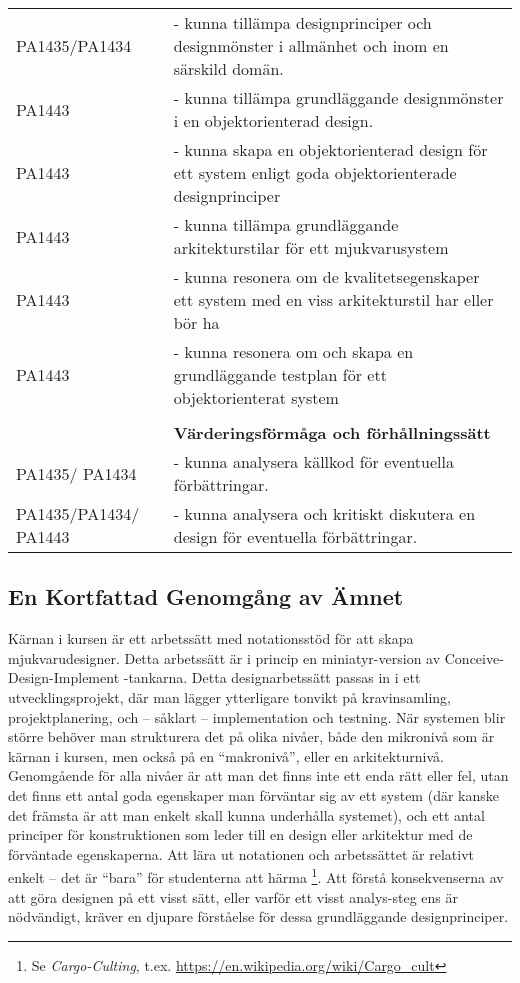 \documentclass[10pt,t,a4paper]{article}
\begin{document}
\begin{table}[!t]
\begin{tabular}{p{3cm}p{12cm}}
PA1435/PA1434 & - kunna tillämpa designprinciper och designmönster i allmänhet och inom en särskild domän.\\
PA1443 & - kunna tillämpa grundläggande designmönster i en objektorienterad design.\\
PA1443 & - kunna skapa en objektorienterad design för ett system enligt goda objektorienterade designprinciper\\
PA1443 & - kunna tillämpa grundläggande arkitekturstilar för ett mjukvarusystem\\
PA1443 & - kunna resonera om de kvalitetsegenskaper ett system med en viss arkitekturstil har eller bör ha\\
PA1443 & - kunna resonera om och skapa en grundläggande testplan för ett objektorienterat system\\
 & \\
 & \textbf{Värderingsförmåga och förhållningssätt}\\
PA1435/ PA1434 & - kunna analysera källkod för eventuella förbättringar.\\
PA1435/PA1434/ PA1443 & - kunna analysera och kritiskt diskutera en design för eventuella förbättringar.\\
\hline
\end{tabular}
\end{table}

\subsection{En Kortfattad Genomgång av Ämnet}
\label{sec:orgheadline1}
Kärnan i kursen är ett arbetssätt med notationsstöd för att skapa mjukvarudesigner. Detta arbetssätt är i princip en miniatyr-version av Conceive-Design-Implement -tankarna. Detta designarbetssätt passas in i ett utvecklingsprojekt, där man lägger ytterligare tonvikt på kravinsamling, projektplanering, och -- såklart -- implementation och testning. När systemen blir större behöver man strukturera det på olika nivåer, både den mikronivå som är kärnan i kursen, men också på en ``makronivå'', eller en arkitekturnivå. Genomgående för alla nivåer är att man det finns inte ett enda rätt eller fel, utan det finns ett antal goda egenskaper man förväntar sig av ett system (där kanske det främsta är att man enkelt skall kunna underhålla systemet), och ett antal principer för konstruktionen som leder till en design eller arkitektur med de förväntade egenskaperna. Att lära ut notationen och arbetssättet är relativt enkelt -- det är ``bara'' för studenterna att härma \footnote{Se \emph{Cargo-Culting}, t.ex. \url{https://en.wikipedia.org/wiki/Cargo_cult}}. Att förstå konsekvenserna av att göra designen på ett visst sätt, eller varför ett visst analys-steg ens är nödvändigt, kräver en djupare förståelse för dessa grundläggande designprinciper.
\end{document}

